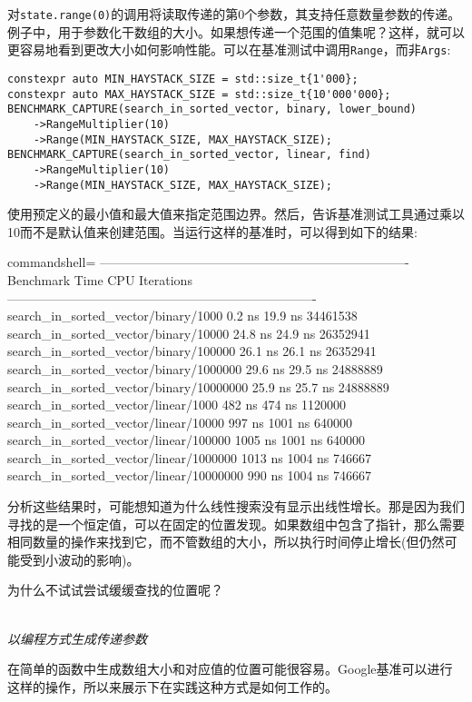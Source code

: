 对\texttt{state.range(0)}的调用将读取传递的第0个参数，其支持任意数量参数的传递。例子中，用于参数化干数组的大小。如果想传递一个范围的值集呢？这样，就可以更容易地看到更改大小如何影响性能。可以在基准测试中调用\texttt{Range}，而非\texttt{Args}:

\begin{lstlisting}[style=styleCXX]
constexpr auto MIN_HAYSTACK_SIZE = std::size_t{1'000};
constexpr auto MAX_HAYSTACK_SIZE = std::size_t{10'000'000};
BENCHMARK_CAPTURE(search_in_sorted_vector, binary, lower_bound)
	->RangeMultiplier(10)
	->Range(MIN_HAYSTACK_SIZE, MAX_HAYSTACK_SIZE);
BENCHMARK_CAPTURE(search_in_sorted_vector, linear, find)
	->RangeMultiplier(10)
	->Range(MIN_HAYSTACK_SIZE, MAX_HAYSTACK_SIZE);
\end{lstlisting}

使用预定义的最小值和最大值来指定范围边界。然后，告诉基准测试工具通过乘以10而不是默认值来创建范围。当运行这样的基准时，可以得到如下的结果:

\begin{tcblisting}{commandshell={}}
-------------------------------------------------------------------------
Benchmark Time CPU Iterations
-------------------------------------------------------------------------
search_in_sorted_vector/binary/1000 0.2 ns 19.9 ns 34461538
search_in_sorted_vector/binary/10000 24.8 ns 24.9 ns 26352941
search_in_sorted_vector/binary/100000 26.1 ns 26.1 ns 26352941
search_in_sorted_vector/binary/1000000 29.6 ns 29.5 ns 24888889
search_in_sorted_vector/binary/10000000 25.9 ns 25.7 ns 24888889
search_in_sorted_vector/linear/1000 482 ns 474 ns 1120000
search_in_sorted_vector/linear/10000 997 ns 1001 ns 640000
search_in_sorted_vector/linear/100000 1005 ns 1001 ns 640000
search_in_sorted_vector/linear/1000000 1013 ns 1004 ns 746667
search_in_sorted_vector/linear/10000000 990 ns 1004 ns 746667
\end{tcblisting}

分析这些结果时，可能想知道为什么线性搜索没有显示出线性增长。那是因为我们寻找的是一个恒定值，可以在固定的位置发现。如果数组中包含了指针，那么需要相同数量的操作来找到它，而不管数组的大小，所以执行时间停止增长(但仍然可能受到小波动的影响)。

为什么不试试尝试缓缓查找的位置呢？

\hspace*{\fill} \\ %
\noindent
\textit{以编程方式生成传递参数}

在简单的函数中生成数组大小和对应值的位置可能很容易。Google基准可以进行这样的操作，所以来展示下在实践这种方式是如何工作的。

